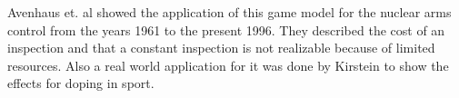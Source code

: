 \documentclass[thesis.tex]{subfiles}
\begin{document}
Avenhaus et. al \cite{Avenhaus.1996} showed the application of this game model for the nuclear arms control from the years 1961 to the present 1996. They described the cost of an inspection and that a constant inspection is not realizable because of limited resources. Also a real world application for it was done by Kirstein \cite{RolandKirstein.2009} to show the effects for doping in sport.

\subfilebib %
\end{document}
